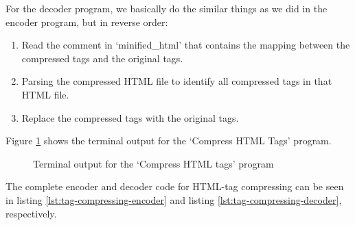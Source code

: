 \documentclass[letterpaper,11pt]{article}
\begin{document}
For the decoder program, we basically do the similar things as we did in the encoder program, but in reverse order:
\begin{enumerate}
	\item Read the comment in `minified\_html' that contains the mapping between the compressed tags and the original tags. 
	\item Parsing the compressed HTML file to identify all compressed tags in that HTML file. 
	\item Replace the compressed tags with the original tags. 
\end{enumerate}
	
Figure \ref{fig:compressedTag} shows the terminal output for the `Compress HTML Tags' program. 

\begin{figure}[H]


	\centering

	\caption{Terminal output for the `Compress HTML tags' program}

	\label{fig:compressedTag}

\end{figure}

The complete encoder and decoder code for HTML-tag compressing can be seen in listing \ref{lst:tag-compressing-encoder} and listing \ref{lst:tag-compressing-decoder}, respectively.
\end{document}
